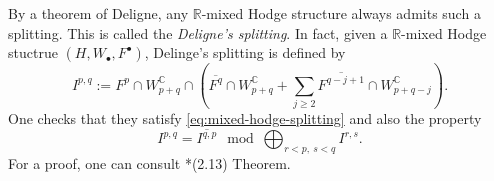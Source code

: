 By a theorem of Deligne, any \(\mathbb{R}\)-mixed Hodge structure always admits 
such a splitting. This is called the \emph{Deligne's splitting}. In fact,
given a \(\mathbb{R}\)-mixed Hodge stuctrue \((H,W_{\bullet},F^{\bullet})\), Delinge's splitting
is defined by
\begin{equation}
I^{p,q}:= F^{p}\cap W^{\mathbb{C}}_{p+q}\cap \left(\overline{F^{q}}\cap W^{\mathbb{C}}_{p+q}+
\sum_{j\ge 2}\overline{F^{q-j+1}}\cap W^{\mathbb{C}}_{p+q-j}\right).
\end{equation}
One checks that they satisfy \eqref{eq:mixed-hodge-splitting}
and also the property 
\begin{equation}
\label{eq:deligne-splitting}
I^{p,q} = \overline{I^{q,p}} \mod{\bigoplus_{r<p,~s<q} I^{r,s}}.
\end{equation}
For a proof, one can consult \cite{1986-Cattani-Kaplan-Schmid-degeneration-of-hodge-structures}*{(2.13) Theorem}.

